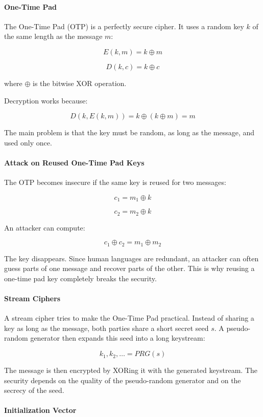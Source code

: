 \paragraph{One-Time Pad}

The One-Time Pad (OTP) is a perfectly secure cipher. It uses a random key
$k$ of the same length as the message $m$:

\[
E(k,m) = k \oplus m
\]

\[
D(k,c) = k \oplus c
\]

where $\oplus$ is the bitwise XOR operation.

Decryption works because:

\[
D(k,E(k,m)) = k \oplus (k \oplus m) = m
\]

The main problem is that the key must be random, as long as the message,
and used only once.

\paragraph{Attack on Reused One-Time Pad Keys}

The OTP becomes insecure if the same key is reused for two messages:

\[
c_1 = m_1 \oplus k
\]

\[
c_2 = m_2 \oplus k
\]

An attacker can compute:

\[
c_1 \oplus c_2 = m_1 \oplus m_2
\]

The key disappears. Since human languages are redundant, an attacker can
often guess parts of one message and recover parts of the other. This is
why reusing a one-time pad key completely breaks the security.

\paragraph{Stream Ciphers}

A stream cipher tries to make the One-Time Pad practical. Instead of
sharing a key as long as the message, both parties share a short secret
seed $s$. A pseudo-random generator then expands this seed into a long
keystream:

\[
k_1, k_2, \ldots = PRG(s)
\]

The message is then encrypted by XORing it with the generated keystream.
The security depends on the quality of the pseudo-random generator and
on the secrecy of the seed.

\paragraph{Initialization Vector}

